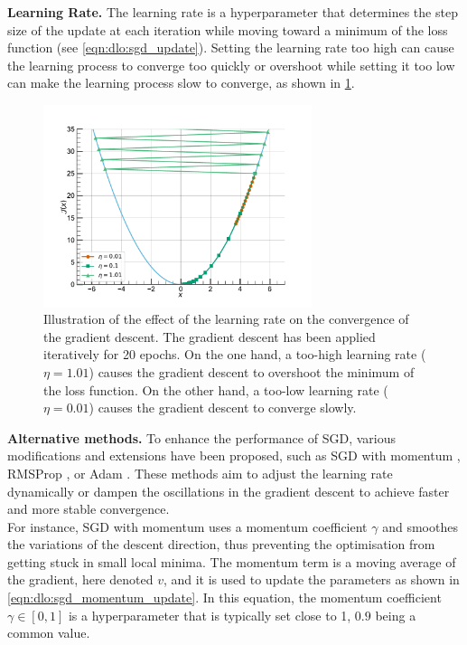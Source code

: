 \noindent \textbf{Learning Rate.} The learning rate is a hyperparameter that
determines the step size of the update at each iteration while moving toward a
minimum of the loss function (see \cref{eqn:dlo:sgd_update}). Setting the
learning rate too high can cause the learning process to converge too quickly or
overshoot while setting it too low can make the learning process slow to
converge, as shown in \cref{fig:dlo:gradient_descent}.\\

\begin{figure}[htbp]
  \centering
  \includegraphics[width=0.7\textwidth]{chapter_dlo/assets/gradient_descent.pdf}
  \caption{Illustration of the effect of the learning rate on the convergence of
    the gradient descent. The gradient descent has been applied iteratively for
    20 epochs. On the one hand, a too-high learning rate ($\eta=1.01$) causes
    the gradient descent to overshoot the minimum of the loss function. On the
    other hand, a too-low learning rate ($\eta=0.01$) causes the gradient
    descent to converge slowly.}
  \label{fig:dlo:gradient_descent}
\end{figure}

\noindent \textbf{Alternative methods.} To enhance the performance of \ac{SGD},
various modifications and extensions have been proposed, such as \ac{SGD} with
momentum \cite{sutskever2013importance,polyak1964some}, RMSProp
\cite{hinton2012neural}, or Adam \cite{kingma2014adam}. These methods aim to
adjust the learning rate dynamically or dampen the oscillations in the gradient
descent to achieve faster and more stable convergence.\\

For instance, \ac{SGD} with momentum
\cite{sutskever2013importance,polyak1964some} uses a momentum coefficient
$\gamma$ and smoothes the variations of the descent direction, thus preventing
the optimisation from getting stuck in small local minima. The momentum term is
a moving average of the gradient, here denoted $v$, and it is used to update the
parameters as shown in \cref{eqn:dlo:sgd_momentum_update}. In this equation, the
momentum coefficient $\gamma \in [0,1]$ is a hyperparameter that is typically
set close to 1, $0.9$ being a common value.\\

